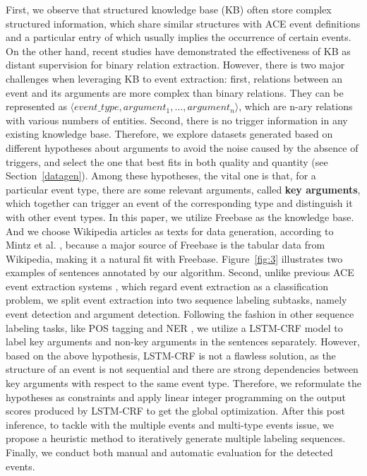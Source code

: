 First, we observe that structured knowledge base (KB) often store
complex structured information, which  share similar structures with ACE event definitions and a particular entry of which usually implies the occurrence of certain events.
On the other hand, recent studies \cite{mintz2009distant,zeng2015distant} have demonstrated the effectiveness of KB as distant supervision for binary relation extraction.
However, there is two major challenges when leveraging KB to event extraction: first, relations between an event and its arguments are more complex than binary relations. They can be represented as $\langle event\_type, argument_1, \ldots, argument_n\rangle$, which are n-ary relations with various numbers of entities. Second, there is no trigger information in any existing knowledge base. 
Therefore, we explore datasets generated based on different hypotheses about arguments to avoid the noise caused by the absence of triggers, and select the one that best fits in both quality and quantity (see Section~\ref{datagen}). Among these hypotheses, the vital one is that, for a particular event type, there are some relevant arguments, called \textbf{key arguments}, which together can trigger an event of the corresponding type and distinguish it with other event types. In this paper, we utilize Freebase as the knowledge base. And we choose Wikipedia articles as texts for data generation, according to Mintz et al. , because a major source of Freebase is the tabular data from Wikipedia, making it a natural fit with Freebase. Figure~\ref{fig:3} illustrates two examples of sentences annotated by our algorithm.
Second, unlike previous ACE event extraction systems \cite{ahn2006stages,li2013joint,chen2015event,nguyen2016joint}, which regard event extraction as a classification problem, we split event extraction into two sequence labeling subtasks, namely event detection and argument detection. Following the fashion in other sequence labeling tasks, like POS tagging and NER \cite{huang2015bidirectional,lample2016neural}, we utilize a LSTM-CRF model to label key arguments and non-key arguments in the sentences separately. However, based on the above hypothesis, LSTM-CRF is not a flawless solution, as the structure of an event is not sequential and there are strong dependencies between key arguments with respect to the same event type. Therefore, we reformulate the hypotheses as constraints and apply linear integer programming on the output scores produced by LSTM-CRF to get the global optimization. After this post inference, to tackle with the multiple events and multi-type events issue, we propose a heuristic method to iteratively generate multiple labeling sequences. Finally, we conduct both manual and automatic evaluation for the detected events.

